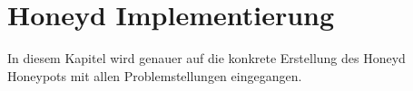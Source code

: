 \section{Honeyd Implementierung}
In diesem Kapitel wird genauer auf die konkrete Erstellung des Honeyd Honeypots mit allen Problemstellungen eingegangen. 


